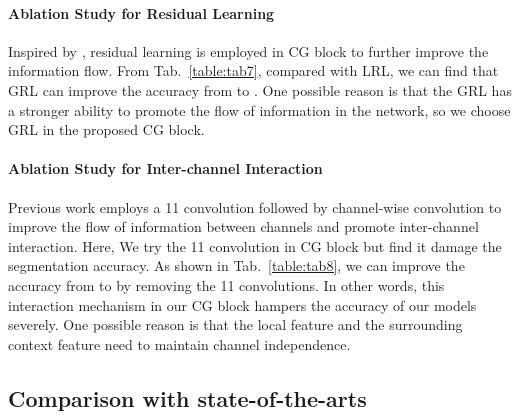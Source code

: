\documentclass[10pt,twocolumn,letterpaper]{article}
\begin{document}
\vspace{-10pt}
\paragraph{Ablation Study for Residual Learning}
Inspired by \cite{he2016deep}, residual learning is employed in CG block to further improve the information flow. From Tab.~\ref{table:tab7}, compared with LRL, we can find that GRL can improve the accuracy from  to . One possible reason is that the GRL has a stronger ability to promote the flow of information in the network, so we choose GRL in the proposed CG block.


\vspace{-10pt}
\paragraph{Ablation Study for Inter-channel Interaction}
Previous work \cite{howard2017mobilenets} employs a 11 convolution followed by channel-wise convolution to improve the flow of information between channels and promote inter-channel interaction. Here, We try the 11 convolution in CG block but find it damage the segmentation accuracy. As shown in Tab.~\ref{table:tab8}, we can improve the accuracy from  to  by removing the 11 convolutions. In other words, this interaction mechanism in our CG block hampers the accuracy of our models severely. One possible reason is that the local feature and the surrounding context feature need to maintain channel independence.






\subsection{Comparison with state-of-the-arts}
\end{document}

